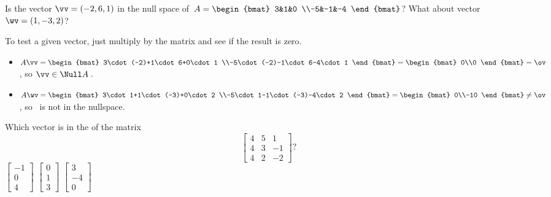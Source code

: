 \begin{example} 
Is the vector \(\vv=(-2,6,1)\) in the null space of~\(A=\begin{bmat} 3&1&0
\\-5&-1&-4 \end{bmat}\)?  
What about vector \(\wv=(1,-3,2)\)?
\begin{solution} 
To test a given vector, just multiply by the matrix and see if the result is zero.
\begin{itemize}
\item \(A\vv=\begin{bmat} 3\cdot(-2)+1\cdot6+0\cdot1
\\-5\cdot(-2)-1\cdot6-4\cdot1 \end{bmat}
=\begin{bmat} 0\\0 \end{bmat}=\ov\), so \(\vv\in\Null A\)\,.
\item \(A\wv=\begin{bmat} 3\cdot1+1\cdot(-3)+0\cdot2
\\-5\cdot1-1\cdot(-3)-4\cdot2 \end{bmat}
=\begin{bmat} 0\\-10 \end{bmat}\neq\ov\), so \wv~is not in the nullspace.
\end{itemize}
\end{solution}
\end{example}


\begin{activity}
Which vector is in the  of the matrix
\begin{equation*}
\begin{bmatrix} 4&5&1
\\4&3&-1
\\4&2&-2 \end{bmatrix}?
\end{equation*}
{\(\begin{bmatrix} -1\\0\\4 \end{bmatrix}\)}
{\(\begin{bmatrix} 0\\1\\3 \end{bmatrix}\)}
{\(\begin{bmatrix} 3\\-4\\0 \end{bmatrix}\)}
\end{activity}
   


